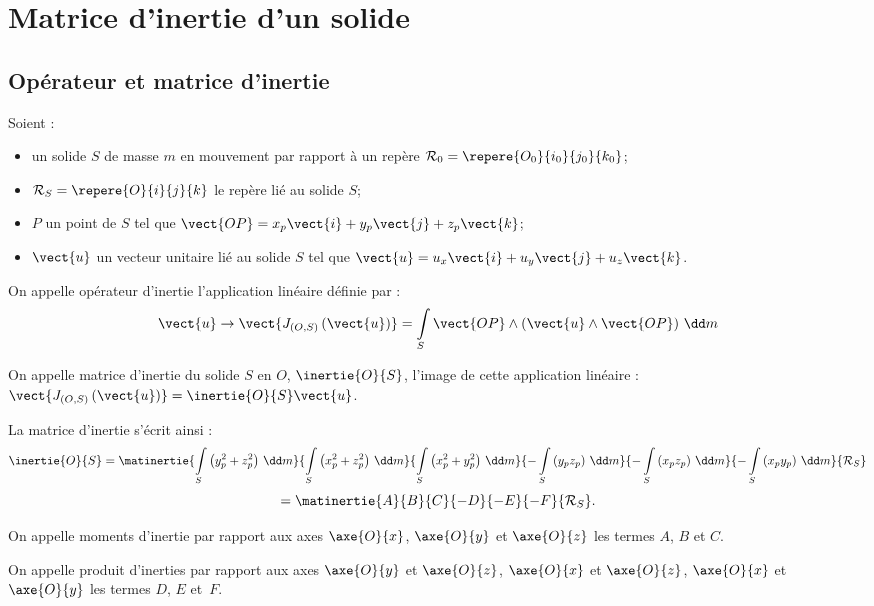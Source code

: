 \section{Matrice d'inertie d'un solide}
\subsection{Opérateur et matrice d'inertie}

\begin{defi}
Soient : 
\begin{itemize}
\item un solide $S$ de masse $m$ en mouvement par rapport à un repère $\mathcal{R}_0=\repere{O_0}{i_0}{j_0}{k_0}$;
\item $\mathcal{R}_S=\repere{O}{i}{j}{k}$ le repère lié au solide $S$;
\item $P$ un point de $S$ tel que $\vect{OP}=x_p\vect{i}+y_p\vect{j}+z_p\vect{k}$;
\item $\vect{u}$ un vecteur unitaire lié au solide $S$ tel que $\vect{u}=u_x \vect{i}+u_y \vect{j}+u_z \vect{k}$.
\end{itemize}

On appelle opérateur d'inertie l'application linéaire définie par :
$$
\vect{u} \rightarrow \vect{J_{\left(O,S\right)}\left(\vect{u}\right)} 
= \int\limits_{S} \vect{OP}\wedge \left(\vect{u}\wedge \vect{OP}\right)\,\dd m
$$

On appelle matrice d'inertie du solide $S$ en $O$, $\inertie{O}{S}$, l'image de cette application linéaire : $\vect{J_{\left(O,S\right)}\left(\vect{u}\right)}  = \inertie{O}{S} \vect{u}$.
 
\end{defi}

\begin{defi}
La matrice d'inertie s'écrit ainsi : 
$$
\inertie{O}{S}=\matinertie{\int\limits_{S} \left(y_p^2 + z_p^2 \right)\,\dd m}{\int\limits_{S} \left(x_p^2 + z_p^2 \right)\,\dd m}{\int\limits_{S} \left(x_p^2 + y_p^2 \right)\,\dd m}{-\int\limits_{S} \left(y_pz_p\right)\,\dd m}{-\int\limits_{S} \left(x_pz_p\right)\,\dd m}{-\int\limits_{S} \left(x_py_p\right)\,\dd m}{\mathcal{R}_S}$$
$$=\matinertie{A}{B}{C}{-D}{-E}{-F}{\mathcal{R}_S}
.$$

On appelle moments d'inertie par rapport aux axes $\axe{O}{{x}}$, $\axe{O}{{y}}$ et $\axe{O}{{z}}$  les termes $A$, $B$ et $C$. 

On appelle produit d'inerties par rapport aux axes $\axe{O}{{y}}$ et $\axe{O}{{z}}$,  $\axe{O}{{x}}$ et $\axe{O}{{z}}$,  $\axe{O}{{x}}$ et $\axe{O}{{y}}$ les termes $D$, $E$ et~$F$.
\end{defi}

